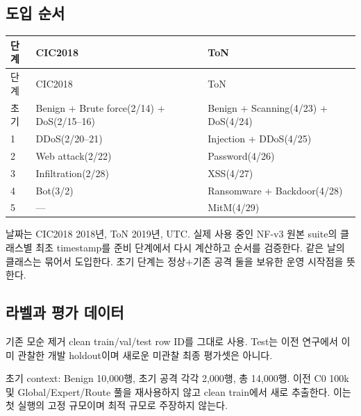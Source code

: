 \subsection{도입 순서}
\begingroup
\footnotesize
\begin{longtable}{>{\raggedleft\arraybackslash}p{}>{\raggedright\arraybackslash}p{}>{\raggedright\arraybackslash}p{}}
\toprule
단계 & CIC2018 & ToN \\ \midrule
\endfirsthead
단계 & CIC2018 & ToN \\ \midrule
\endhead
{}초기 & Benign +\allowbreak{} Brute force(2/\allowbreak{}14) +\allowbreak{} DoS(2/\allowbreak{}15–16) & Benign +\allowbreak{} Scanning(4/\allowbreak{}23) +\allowbreak{} DoS(4/\allowbreak{}24) \\
{}1 & DDoS(2/\allowbreak{}20–21) & Injection +\allowbreak{} DDoS(4/\allowbreak{}25) \\
{}2 & Web attack(2/\allowbreak{}22) & Password(4/\allowbreak{}26) \\
{}3 & Infiltration(2/\allowbreak{}28) & XSS(4/\allowbreak{}27) \\
{}4 & Bot(3/\allowbreak{}2) & Ransomware +\allowbreak{} Backdoor(4/\allowbreak{}28) \\
{}5 & — & MitM(4/\allowbreak{}29) \\
\bottomrule
\end{longtable}
\endgroup
날짜는 CIC2018 2018년, ToN 2019년, UTC. 실제 사용 중인 NF-v3 원본 suite의 클래스별 최초 timestamp를 준비 단계에서 다시 계산하고 순서를 검증한다. 같은 날의 클래스는 묶어서 도입한다. 초기 단계는 정상+\allowbreak{}기존 공격 둘을 보유한 운영 시작점을 뜻한다.

\subsection{라벨과 평가 데이터}
\par\noindent \textbullet\enspace 기존 모순 제거 clean train/\allowbreak{}val/\allowbreak{}test row ID를 그대로 사용. Test는 이전 연구에서 이미 관찰한 개발 holdout이며 새로운 미관찰 최종 평가셋은 아니다.


\par\noindent \textbullet\enspace 초기 context: Benign 10,000행, 초기 공격 각각 2,000행, 총 14,000행. 이전 C0 100k 및 Global/\allowbreak{}Expert/\allowbreak{}Route 풀을 재사용하지 않고 clean train에서 새로 추출한다. 이는 첫 실행의 고정 규모이며 최적 규모로 주장하지 않는다.


